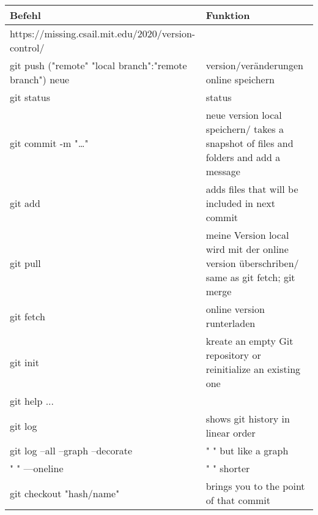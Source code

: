 




\begin{center}
    \begin{tabular}{ |  p{8cm}  |   p{8cm}  |}
    \hline  

        Befehl  &   Funktion\\
        \hline
        https://missing.csail.mit.edu/2020/version-control/	& \\
        \hline
        git push ("remote" "local branch":"remote branch")	neue    &    version/veränderungen online speichern \\
        \hline
        git status	    &   status \\
        \hline
        git commit -m "…"	&   neue version local speichern/ takes a snapshot of files and folders and add a message \\
        \hline
        git add	    &   adds files that will be included in next commit \\
        \hline
        git pull	&   meine Version local wird mit der online version überschriben/ same as git fetch; git merge \\
        \hline
        git fetch	&   online version runterladen \\
        \hline
        git init	&   kreate an empty Git repository or reinitialize an existing one \\
        \hline
        git help ...	& \\
        \hline
        git log	    &   shows git history in linear order \\
        \hline
        git log --all --graph --decorate	&   " " but like a graph \\
        \hline
        " " —oneline	 &  " " shorter \\
        \hline
        git checkout "hash/name"	&   brings you to the point of that commit \\
        \hline
    \end{tabular}
\end{center}


